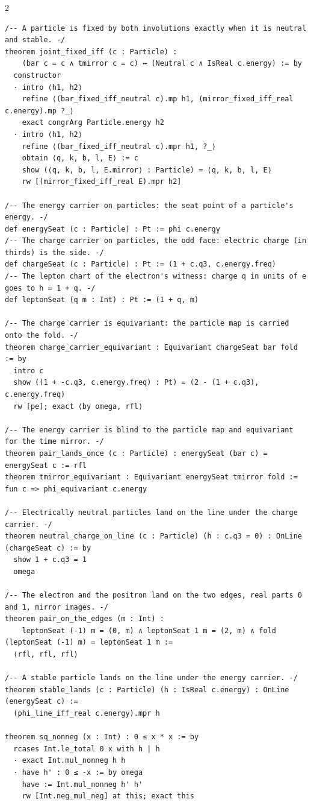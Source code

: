 \documentclass[10pt]{article}
\begin{document}
\begin{multicols}{2}
\begin{Verbatim}[fontsize=\fontsize{6.0}{6.9}\selectfont,breaklines,breakanywhere,breaksymbolleft={}]
/-- A particle is fixed by both involutions exactly when it is neutral and stable. -/
theorem joint_fixed_iff (c : Particle) :
    (bar c = c ∧ tmirror c = c) ↔ (Neutral c ∧ IsReal c.energy) := by
  constructor
  · intro ⟨h1, h2⟩
    refine ⟨(bar_fixed_iff_neutral c).mp h1, (mirror_fixed_iff_real c.energy).mp ?_⟩
    exact congrArg Particle.energy h2
  · intro ⟨h1, h2⟩
    refine ⟨(bar_fixed_iff_neutral c).mpr h1, ?_⟩
    obtain ⟨q, k, b, l, E⟩ := c
    show (⟨q, k, b, l, E.mirror⟩ : Particle) = ⟨q, k, b, l, E⟩
    rw [(mirror_fixed_iff_real E).mpr h2]

/-- The energy carrier on particles: the seat point of a particle's energy. -/
def energySeat (c : Particle) : Pt := phi c.energy
/-- The charge carrier on particles, the odd face: electric charge (in thirds) is the side. -/
def chargeSeat (c : Particle) : Pt := (1 + c.q3, c.energy.freq)
/-- The lepton chart of the electron's witness: charge q in units of e goes to h = 1 + q. -/
def leptonSeat (q m : Int) : Pt := (1 + q, m)

/-- The charge carrier is equivariant: the particle map is carried onto the fold. -/
theorem charge_carrier_equivariant : Equivariant chargeSeat bar fold := by
  intro c
  show ((1 + -c.q3, c.energy.freq) : Pt) = (2 - (1 + c.q3), c.energy.freq)
  rw [pe]; exact ⟨by omega, rfl⟩

/-- The energy carrier is blind to the particle map and equivariant for the time mirror. -/
theorem pair_lands_once (c : Particle) : energySeat (bar c) = energySeat c := rfl
theorem tmirror_equivariant : Equivariant energySeat tmirror fold := fun c => phi_equivariant c.energy

/-- Electrically neutral particles land on the line under the charge carrier. -/
theorem neutral_charge_on_line (c : Particle) (h : c.q3 = 0) : OnLine (chargeSeat c) := by
  show 1 + c.q3 = 1
  omega

/-- The electron and the positron land on the two edges, real parts 0 and 1, mirror images. -/
theorem pair_on_the_edges (m : Int) :
    leptonSeat (-1) m = (0, m) ∧ leptonSeat 1 m = (2, m) ∧ fold (leptonSeat (-1) m) = leptonSeat 1 m :=
  ⟨rfl, rfl, rfl⟩

/-- A stable particle lands on the line under the energy carrier. -/
theorem stable_lands (c : Particle) (h : IsReal c.energy) : OnLine (energySeat c) :=
  (phi_line_iff_real c.energy).mpr h

theorem sq_nonneg (x : Int) : 0 ≤ x * x := by
  rcases Int.le_total 0 x with h | h
  · exact Int.mul_nonneg h h
  · have h' : 0 ≤ -x := by omega
    have := Int.mul_nonneg h' h'
    rw [Int.neg_mul_neg] at this; exact this


\end{Verbatim}
\end{multicols}
\end{document}
